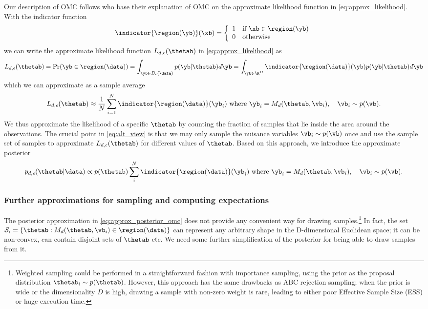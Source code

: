 Our description of OMC follows \citet{Ikonomov2019} who base their explanation of OMC on the approximate likelihood function in \eqref{eq:approx_likelihood}. With the indicator function
%
\begin{equation} \label{eq:indicator} \indicator{\region(\yb)}(\xb)=
  \left\{
    \begin{array}{ll}
      1 & \mbox{if } \xb \in \region(\yb) \\
      0 & \mbox{otherwise} 
    \end{array} \right. \end{equation}
%
we can write the approximate likelihood function $L_{d, \epsilon}(\thetab)$ in \eqref{eq:approx_likelihood} as
\begin{gather} \label{eq:approx_likelihood_omc}
  L_{d, \epsilon}(\thetab) = \Pr(\yb \in \region(\data)) =
  \int_{\yb \in B_\epsilon(\data)}p(\yb|\thetab)d\yb =
  \int_{\yb \in \R^D} \indicator{\region(\data)}(\yb)p(\yb|\thetab)d\yb
\end{gather}
which we can approximate as a sample average
\begin{equation}
L_{d, \epsilon}(\thetab) \approx \frac{1}{N} \sum_{i=1}^N \indicator{\region (\data)} (\yb_i)
  \text{ where } \yb_i = M_d(\thetab, \vb_i), \quad \vb_i \sim p(\vb). \label{eq:alt_view}
\end{equation}
We thus approximate the likelihood of a
specific $\thetab$ by counting the fraction of samples that lie inside the area around the
observations. The crucial point in \eqref{eq:alt_view} is that we may only sample the nuisance variables $\vb_i \sim p(\vb)$ once and use the sample set of samples to approximate $L_{d,\epsilon}(\thetab)$ for different values of $\thetab$. Based on this approach, we introduce the approximate posterior
\begin{equation} \label{eq:approx_posterior_omc}
  p_{d,\epsilon}(\thetab|\data)
  \propto p(\thetab) \sum_i^N \indicator{ \region(\data)} (\yb_i) \text{ where } \yb_i = M_d(\thetab, \vb_i), \quad \vb_i \sim p(\vb).
\end{equation}

\subsubsection*{Further approximations for sampling and computing expectations}

The posterior approximation in \eqref{eq:approx_posterior_omc} does
not provide any convenient way for drawing samples.\footnote{Weighted
  sampling could be performed in a straightforward fashion with
  importance sampling, using the prior as the proposal distribution
  $\thetab_i \sim p(\thetab)$. However, this approach has the same
  drawbacks as ABC rejection sampling; when the prior is wide or the
  dimensionality $D$ is high, drawing a sample with non-zero weight is
  rare, leading to either poor Effective Sample Size (ESS) or huge
  execution time.} In fact, the set
$\mathcal{S}_i = \{ \thetab: M_d(\thetab, \vb_i) \in \region(\data)
\}$ can represent any arbitrary shape in the D-dimensional Euclidean
space; it can be non-convex, can contain disjoint sets of $\thetab$
etc. We need some further simplification of the posterior for being
able to draw samples from it.

